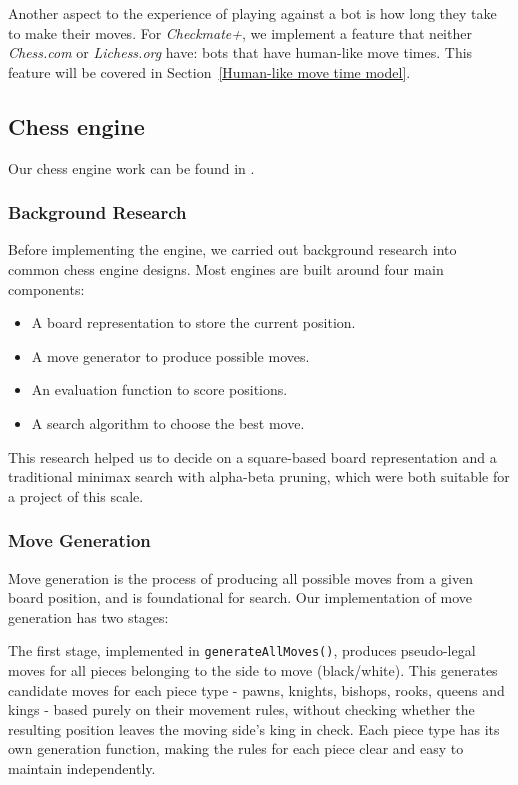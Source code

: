 \documentclass[12pt,titlepage,a4paper]{article}
\begin{document}
    Another aspect to the experience of playing against a bot is how long they take to make their moves. For \textit{Checkmate+}, we implement a feature that neither \textit{Chess.com} or \textit{Lichess.org} have: bots that have human-like move times.
    This feature will be covered in Section~\ref{Human-like move time model}.

    \subsection{Chess engine}
    \label{Chess engine}

    Our chess engine work can be found in .

    \subsubsection{Background Research}
    Before implementing the engine, we carried out background research into common chess engine designs. Most engines are built around four main components: \citep{cpwiki-getting-started}

    \begin{itemize}
        \item A board representation to store the current position.
        \item A move generator to produce possible moves.
        \item An evaluation function to score positions.
        \item A search algorithm to choose the best move.
    \end{itemize}

    This research helped us to decide on a square-based board representation and a traditional minimax search with alpha-beta pruning, which were both suitable for a project of this scale.

    \subsubsection{Move Generation}
    Move generation is the process of producing all possible moves from a given board position, and is foundational for search. Our implementation of move generation has two stages:

    The first stage, implemented in \texttt{generateAllMoves()}, produces pseudo-legal moves for all pieces belonging to the side to move (black/white). This generates candidate moves for each piece type - pawns, knights, bishops, rooks, queens and kings - based purely on their movement rules, without checking whether the resulting position leaves the moving side's king in check. Each piece type has its own generation function, making the rules for each piece clear and easy to maintain independently.
\end{document}
